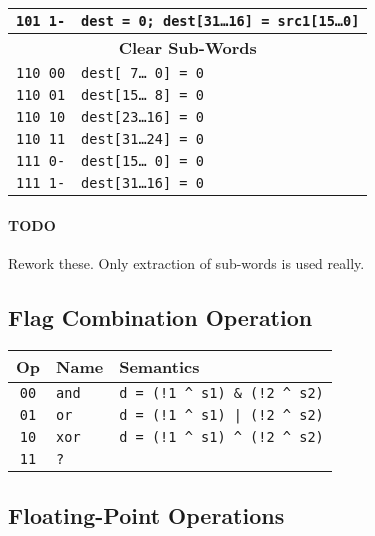 \documentclass[10pt,a4paper]{article}
\begin{document}
\begin{tabular}{cl}
\texttt{101 1-} & \texttt{dest = 0; dest[31\ldots{}16] = src1[15\ldots{}0]} \\
\midrule
\multicolumn{2}{c}{\textbf{Clear Sub-Words}} \\
\cmidrule{1-2}
\texttt{110 00} & \texttt{dest[ 7\ldots{}\ 0] = 0} \\
\texttt{110 01} & \texttt{dest[15\ldots{}\ 8] = 0} \\
\texttt{110 10} & \texttt{dest[23\ldots{}16] = 0} \\
\texttt{110 11} & \texttt{dest[31\ldots{}24] = 0} \\
\cmidrule{1-2}
\texttt{111 0-} & \texttt{dest[15\ldots{}\ 0] = 0} \\
\texttt{111 1-} & \texttt{dest[31\ldots{}16] = 0} \\
\bottomrule  
\end{tabular}

\paragraph{TODO} Rework these. Only extraction of sub-words is used really.

\subsection{Flag Combination Operation}
\label{sec:comb}

\begin{tabular}{cll}
\toprule
Op & Name & Semantics \\
\midrule
\texttt{00} & \texttt{and} & \texttt{d = (!1 \textasciicircum{} s1) \& (!2 \textasciicircum{} s2)} \\
\texttt{01} & \texttt{or} & \texttt{d = (!1 \textasciicircum{} s1) | (!2 \textasciicircum{} s2)} \\
\texttt{10} & \texttt{xor} & \texttt{d = (!1 \textasciicircum{} s1) \textasciicircum{} (!2 \textasciicircum{} s2)} \\
\texttt{11} & \texttt{?} & \\
\bottomrule  
\end{tabular}


\pagebreak

\subsection{Floating-Point Operations}
\label{sec:fop}
\end{document}
